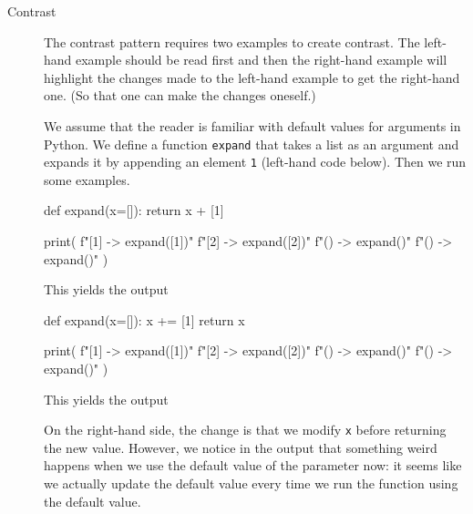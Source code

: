 \begin{description}
  \item[Contrast] The contrast pattern requires two examples to create 
    contrast.
    The left-hand example should be read first and then the right-hand 
    example will highlight the changes made to the left-hand example to get 
    the right-hand one.
    (So that one can make the changes oneself.)

    We assume that the reader is familiar with default values for arguments in 
    Python.
    We define a function \texttt{expand} that takes a list as an 
    argument and expands it by appending an element \texttt{1} 
    (left-hand code below).
    Then we run some examples.

    \hfill
    \begin{minipage}[t]{0.45\columnwidth}
      \begin{pyblock}[default1]
def expand(x=[]):
  return x + [1]


print(
  f"[1] -> {expand([1])}\n"
  f"[2] -> {expand([2])}\n"
  f"()  -> {expand()}\n"
  f"()  -> {expand()}\n"
)
      \end{pyblock}
      \vspace{0.5em}
      This yields the output
      \vspace{0.5em}
      \printpythontex[verbatim]
    \end{minipage}
    \hfill
    \begin{minipage}[t]{0.45\columnwidth}
      \begin{pyblock}[default2][highlightlines={2-3}]
def expand(x=[]):
  x += [1]
  return x

print(
  f"[1] -> {expand([1])}\n"
  f"[2] -> {expand([2])}\n"
  f"()  -> {expand()}\n"
  f"()  -> {expand()}\n"
)
      \end{pyblock}

      \vspace{0.5em}
      This yields the output
      \vspace{0.5em}
      \printpythontex[verbatim][highlightlines={4}]
    \end{minipage}
    \hfill

    On the right-hand side, the change is that we modify \texttt{x} 
    before returning the new value.
    However, we notice in the output that something weird happens when we use 
    the default value of the parameter now:
    it seems like we actually update the default value every time we run the 
    function using the default value.


\end{description}
